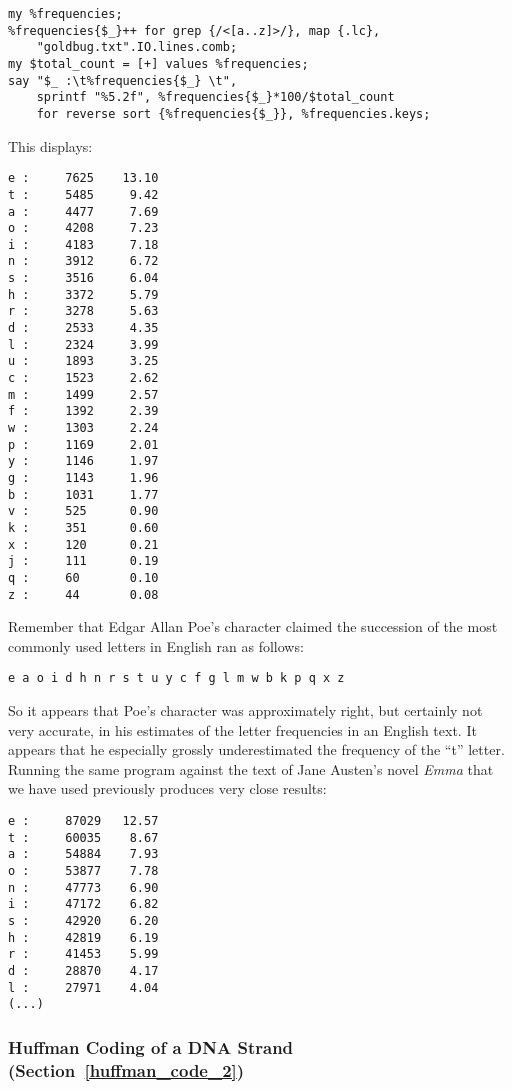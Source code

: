 \begin{verbatim}
my %frequencies;
%frequencies{$_}++ for grep {/<[a..z]>/}, map {.lc}, 
    "goldbug.txt".IO.lines.comb;
my $total_count = [+] values %frequencies;
say "$_ :\t%frequencies{$_} \t", 
    sprintf "%5.2f", %frequencies{$_}*100/$total_count  
    for reverse sort {%frequencies{$_}}, %frequencies.keys;
\end{verbatim}   

This displays:
\begin{verbatim}
e :     7625    13.10
t :     5485     9.42
a :     4477     7.69
o :     4208     7.23
i :     4183     7.18
n :     3912     6.72
s :     3516     6.04
h :     3372     5.79
r :     3278     5.63
d :     2533     4.35
l :     2324     3.99
u :     1893     3.25
c :     1523     2.62
m :     1499     2.57
f :     1392     2.39
w :     1303     2.24
p :     1169     2.01
y :     1146     1.97
g :     1143     1.96
b :     1031     1.77
v :     525      0.90
k :     351      0.60
x :     120      0.21
j :     111      0.19
q :     60       0.10
z :     44       0.08
\end{verbatim}

Remember that Edgar Allan Poe's character claimed the succession 
of the most commonly used letters in English ran as 
follows:

\begin{verbatim}
e a o i d h n r s t u y c f g l m w b k p q x z
\end{verbatim}

So it appears that Poe's character was approximately 
right, but certainly not very accurate, in his estimates of the 
letter frequencies in an English text. It appears that he 
especially grossly underestimated the frequency of the ``t'' letter. 
Running the same program against the text of Jane Austen's 
novel \emph{Emma} that we have used previously produces very 
close results:

\begin{verbatim}
e :     87029   12.57
t :     60035    8.67
a :     54884    7.93
o :     53877    7.78
n :     47773    6.90
i :     47172    6.82
s :     42920    6.20
h :     42819    6.19
r :     41453    5.99
d :     28870    4.17
l :     27971    4.04
(...)
\end{verbatim}

\subsubsection{Huffman Coding of a DNA Strand (Section~\ref{huffman_code_2})}
\label{sol_huffman_code_2}

